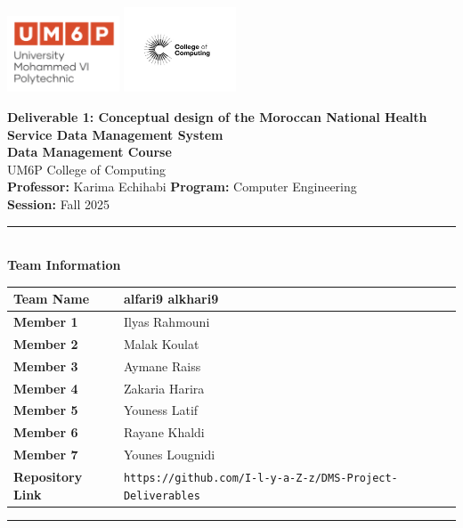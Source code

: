 \documentclass[a4paper,12pt]{article}
\begin{document}
\thispagestyle{empty}
\begin{center}
  \includegraphics[width=0.25\textwidth]{Figures/UM6Plogo.png}\hfill
  \includegraphics[width=0.25\textwidth]{Figures/CC.jpg}
  \vspace{1.2cm}

  {\LARGE \textbf{Deliverable 1: Conceptual design of the Moroccan National Health Service Data Management System}}\\[0.6cm]
  {\large \textbf{Data Management Course}}\\[0.2cm]
  {\large UM6P College of Computing}\\[0.8cm]

  {\normalsize \textbf{Professor:} Karima Echihabi \quad 
   \textbf{Program:} Computer Engineering}\\[0.1cm]
  {\normalsize \textbf{Session:} Fall 2025}\\[1cm]

  \rule{0.9\textwidth}{0.5pt}\\[0.5cm]
  {\large \textbf{Team Information}} \\[0.3cm]
  \begin{tabular}{|l|l|}
    \hline
    \textbf{Team Name} & alfari9 alkhari9 \\ \hline
    \textbf{Member 1}  & Ilyas Rahmouni \\ \hline
    \textbf{Member 2}  & Malak Koulat   \\ \hline
    \textbf{Member 3}  & Aymane Raiss   \\ \hline
    \textbf{Member 4}  & Zakaria Harira   \\ \hline
    \textbf{Member 5}  & Youness Latif   \\ \hline
    \textbf{Member 6}  & Rayane Khaldi   \\ \hline
    \textbf{Member 7}  & Younes Lougnidi   \\ \hline
    \textbf{Repository Link} & \texttt{https://github.com/I-l-y-a-Z-z/DMS-Project-Deliverables} \\ \hline
  \end{tabular}
  \rule{0.9\textwidth}{0.5pt}\\
\end{center}
\clearpage
\pagestyle{fancy}
\end{document}
